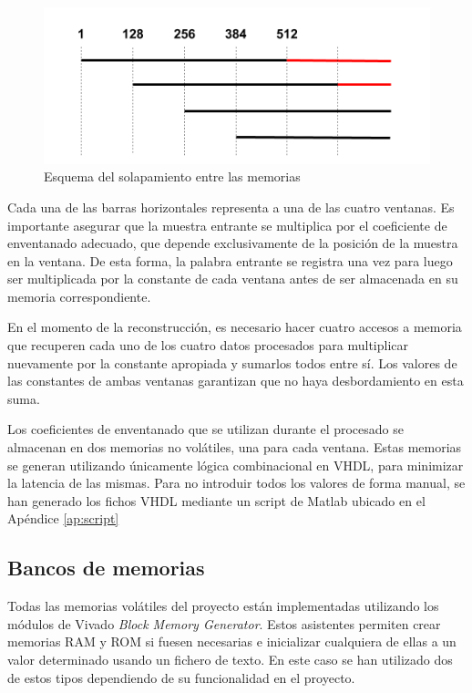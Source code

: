 \begin{figure}[!b]
\begin{center}
\includegraphics[width=13cm]{img/solap.png}
\caption{\label{fig:solap}Esquema del solapamiento entre las memorias}
\end{center}
\end{figure}

Cada una de las barras horizontales representa a una de las cuatro ventanas. Es importante asegurar que la muestra entrante se multiplica por el coeficiente de enventanado adecuado, que depende exclusivamente de la posición de la muestra en la ventana. De esta forma, la palabra entrante se registra una vez para luego ser multiplicada por la constante de cada ventana antes de ser almacenada en su memoria correspondiente.

En el momento de la reconstrucción, es necesario hacer cuatro accesos a memoria que recuperen cada uno de los cuatro datos procesados para multiplicar nuevamente por la constante apropiada y sumarlos todos entre sí. Los valores de las constantes de ambas ventanas garantizan que no haya desbordamiento en esta suma.

Los coeficientes de enventanado que se utilizan durante el procesado se almacenan en dos memorias no volátiles, una para cada ventana. Estas memorias se generan utilizando únicamente lógica combinacional en VHDL, para minimizar la latencia de las mismas. Para no introduir todos los valores de forma manual, se han generado los fichos VHDL mediante un script de Matlab ubicado en el Apéndice \ref{ap:script}

\subsection{Bancos de memorias\label{memo}}
Todas las memorias volátiles del proyecto están implementadas utilizando los módulos de Vivado \emph{Block Memory Generator}. Estos asistentes permiten crear memorias RAM y ROM si fuesen necesarias e inicializar cualquiera de ellas a un valor determinado usando un fichero de texto. En este caso se han utilizado dos de estos tipos dependiendo de su funcionalidad en el proyecto.

